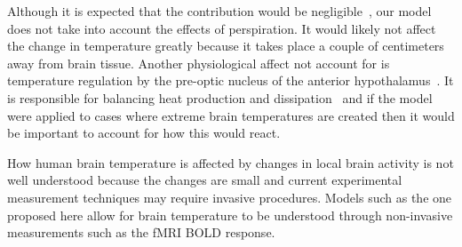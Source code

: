 Although it is expected that the contribution would be negligible~\citep{nadel1971}, our model does not take into account the effects of perspiration. It would likely not affect the change in temperature greatly because it takes place a couple of centimeters away from brain tissue.  Another physiological affect not account for is temperature regulation by the pre-optic nucleus of the anterior hypothalamus~\citep{bertolizio2011}. It is responsible for balancing heat production and dissipation~\citep{simon1993} and if the model were applied to cases where extreme brain temperatures are created then it would be important to account for how this would react.

How human brain temperature is affected by changes in local brain activity is not well understood because the changes are small and current experimental measurement techniques may require invasive procedures. Models such as the one proposed here allow for brain temperature to be understood through non-invasive measurements such as the fMRI BOLD response.


